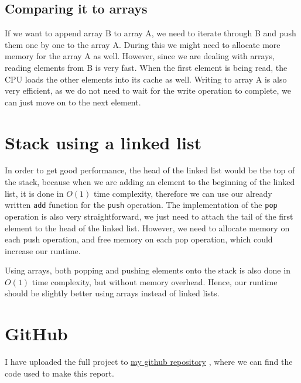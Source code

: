 \documentclass[a4paper,11pt]{article}
\newcommand{\underlinehref}[2]{%
    \href{#1}{\ul{#2}}%
}
\begin{document}
    \subsection*{Comparing it to arrays}

    If we want to append array B to array A, we need to iterate through B and push them one by one to the array A.
    During this we might need to allocate more memory for the array A as well.
    However, since we are dealing with arrays, reading elements from B is very fast.
    When the first element is being read, the CPU loads the other elements into its cache as well.
    Writing to array A is also very efficient, as we do not need to wait for the write operation to complete, we can just move on to the next element.

    \section*{Stack using a linked list}

    In order to get good performance, the head of the linked list would be the top of the stack, because when we are adding an element to the beginning of the linked list, it is done in $O(1)$ time complexity, therefore we can use our already written {\tt add} function for the {\tt push} operation.
    The implementation of the {\tt pop} operation is also very straightforward, we just need to attach the tail of the first element to the head of the linked list.
    However, we need to allocate memory on each push operation, and free memory on each pop operation, which could increase our runtime.

    Using arrays, both popping and pushing elements onto the stack is also done in $O(1)$ time complexity, but without memory overhead.
    Hence, our runtime should be slightly better using arrays instead of linked lists.

    \section*{GitHub}
    I have uploaded the full project to \underlinehref{https://github.com/peterherczku/ID1021/tree/main/assignment-5}{my github repository}, where we can find the code used to make this report.
\end{document}
